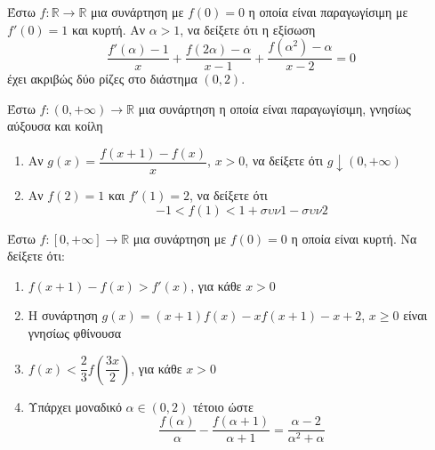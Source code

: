 \documentclass{../presentation}
\begin{document}
\begin{askisi}
  Έστω $f:\mathbb{R}\to\mathbb{R}$ μια συνάρτηση με $f(0)=0$ η οποία είναι παραγωγίσιμη με $f'(0)=1$ και κυρτή. Αν $α>1$, να δείξετε ότι η εξίσωση
  $$\frac{f'(α)-1}{x}+\frac{f(2α)-α}{x-1}+\frac{f(α^2)-α}{x-2}=0$$
  έχει ακριβώς δύο ρίζες στο διάστημα $(0,2)$.
\end{askisi}

\begin{askisi}
  Έστω $f:(0,+\infty)\to\mathbb{R}$ μια συνάρτηση η οποία είναι παραγωγίσιμη, γνησίως αύξουσα και κοίλη
  \begin{enumerate}[<+->]
    \item Αν $g(x)=\dfrac{f(x+1)-f(x)}{x}$, $x>0$, να δείξετε ότι $g\downarrow (0,+\infty)$
    \item Αν $f(2)=1$ και $f'(1)=2$, να δείξετε ότι
          $$-1<f(1)<1+συν1-συν2$$
  \end{enumerate}
\end{askisi}

\begin{askisi}
  Έστω $f:[0,+\infty]\to\mathbb{R}$ μια συνάρτηση με $f(0)=0$ η οποία είναι κυρτή. Να δείξετε ότι:
  \begin{enumerate}[<+->]
    \item $f(x+1)-f(x)>f'(x)$, για κάθε $x>0$
    \item Η συνάρτηση $g(x)=(x+1)f(x)-xf(x+1)-x+2$, $x\ge 0$ είναι γνησίως φθίνουσα
    \item $f(x)<\dfrac{2}{3}f\left(\dfrac{3x}{2}\right)$, για κάθε $x>0$
    \item Υπάρχει μοναδικό $α\in (0,2)$ τέτοιο ώστε
          $$\frac{f(α)}{α}-\frac{f(α+1)}{α+1}=\frac{α-2}{α^2+α}$$
  \end{enumerate}
\end{askisi}
\end{document}

